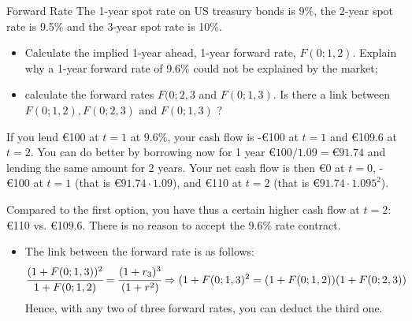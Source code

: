 \documentclass{beamer}
\begin{document}
\begin{frame}{}
\begin{block}{Forward Rate}
The 1-year spot rate on US treasury bonds is 9\%, the 2-year spot rate is 9.5\% and the 3-year spot rate is 10\%. 
\begin{itemize}
\item Calculate the implied 1-year ahead, 1-year forward rate, $F(0;1,2)$. Explain why a 1-year forward rate of 9.6\% could not be explained by the market;
\item calculate the forward rates  $F(0; 2, 3$ and $F(0; 1,3)$. Is there a link between $F(0;1,2),F(0;2,3)$ and $F(0;1,3)$ ?
\end{itemize}
\end{block}
\end{frame}

\begin{frame}{}
If you lend €100 at $t=1$ at 9.6\%, your cash flow is -€100 at $t=1$ and €109.6 at $t=2$. 
You can do better by borrowing now for 1 year $€100/1.09=€91.74$ and lending the same amount for 2 years. Your net cash flow is then €0 at $t=0$, -€100 at $t=1$ (that is $€91.74\cdot 1.09$), and €110 at $t=2$ (that is $€91.74\cdot 1.095^2$). 

Compared to the first option, you have thus a certain higher cash flow at $t=2$: €110 vs. €109.6.  There is no reason to accept the 9.6\% rate contract. 
\begin{itemize}
\item The link between the forward rate is as follows:
\begin{equation*}
\cfrac{(1+F(0;1,3))^2}{1+F(0;1,2)} = \cfrac{(1+r_3)^3}{(1+r^2)} \Rightarrow (1+F(0;1,3)^2 = (1+F(0;1,2))(1+F(0;2,3))
\end{equation*}
Hence, with any two of three forward rates, you can deduct the third one.
\end{itemize}
\end{frame}
\end{document}
